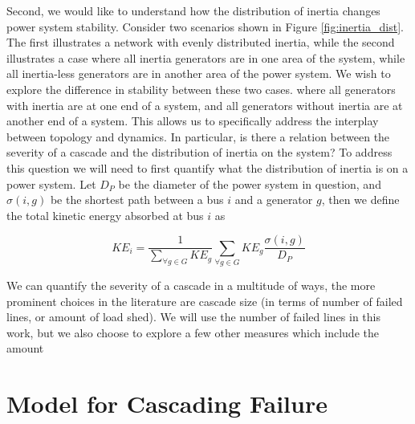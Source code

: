Second, we would like to understand how the distribution of inertia changes power system stability.  Consider two scenarios shown in Figure \ref{fig:inertia_dist}.  The first illustrates a network with evenly distributed inertia, while the second illustrates a case where all inertia generators are in one area of the system, while all inertia-less generators are in another area of the power system.  We wish to explore the difference in stability between these two cases.  where all generators with inertia are at one end of a system, and all generators without inertia are at another end of a system.  This allows us to specifically address the interplay between topology and dynamics.  In particular, is there a relation between the severity of a cascade and the distribution of inertia on the system?  To address this question we will need to first quantify what the distribution of inertia is on a power system.  Let $D_P$ be the diameter of the power system in question, and $\sigma(i,g)$ be the shortest path between a bus $i$ and a generator $g$, then we define the total kinetic energy absorbed at bus $i$ as


\begin{equation}
KE_i = \frac{1}{\sum_{\forall g \in G}KE_g}\sum_{\forall g \in G}KE_g\frac{\sigma (i,g)}{D_P}
\label{eqtn:ke_bus}
\end{equation}

We can quantify the severity of a cascade in a multitude of ways, the more prominent choices in the literature are cascade size (in terms of number of failed lines, or amount of load shed).  We will use the number of failed lines in this work, but we also choose to explore a few other measures which include the amount 

\section{Model for Cascading Failure}

